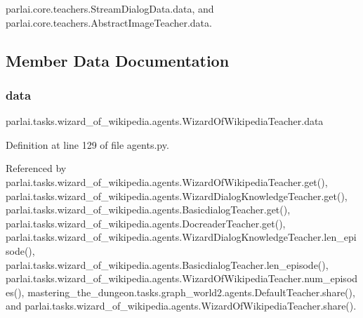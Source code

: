 parlai.\+core.\+teachers.\+Stream\+Dialog\+Data.\+data, and parlai.\+core.\+teachers.\+Abstract\+Image\+Teacher.\+data.



\subsection{Member Data Documentation}
\mbox{\label{classparlai_1_1tasks_1_1wizard__of__wikipedia_1_1agents_1_1WizardOfWikipediaTeacher_acb5f4b5a002320ef54a635a90de99960}} 
\subsubsection{\texorpdfstring{data}{data}}
{\footnotesize\ttfamily parlai.\+tasks.\+wizard\+\_\+of\+\_\+wikipedia.\+agents.\+Wizard\+Of\+Wikipedia\+Teacher.\+data}



Definition at line 129 of file agents.\+py.



Referenced by parlai.\+tasks.\+wizard\+\_\+of\+\_\+wikipedia.\+agents.\+Wizard\+Of\+Wikipedia\+Teacher.\+get(), parlai.\+tasks.\+wizard\+\_\+of\+\_\+wikipedia.\+agents.\+Wizard\+Dialog\+Knowledge\+Teacher.\+get(), parlai.\+tasks.\+wizard\+\_\+of\+\_\+wikipedia.\+agents.\+Basicdialog\+Teacher.\+get(), parlai.\+tasks.\+wizard\+\_\+of\+\_\+wikipedia.\+agents.\+Docreader\+Teacher.\+get(), parlai.\+tasks.\+wizard\+\_\+of\+\_\+wikipedia.\+agents.\+Wizard\+Dialog\+Knowledge\+Teacher.\+len\+\_\+episode(), parlai.\+tasks.\+wizard\+\_\+of\+\_\+wikipedia.\+agents.\+Basicdialog\+Teacher.\+len\+\_\+episode(), parlai.\+tasks.\+wizard\+\_\+of\+\_\+wikipedia.\+agents.\+Wizard\+Of\+Wikipedia\+Teacher.\+num\+\_\+episodes(), mastering\+\_\+the\+\_\+dungeon.\+tasks.\+graph\+\_\+world2.\+agents.\+Default\+Teacher.\+share(), and parlai.\+tasks.\+wizard\+\_\+of\+\_\+wikipedia.\+agents.\+Wizard\+Of\+Wikipedia\+Teacher.\+share().

\mbox{\label{classparlai_1_1tasks_1_1wizard__of__wikipedia_1_1agents_1_1WizardOfWikipediaTeacher_a9d14d7a5483ecef2808274cee9ec3e3c}} 
